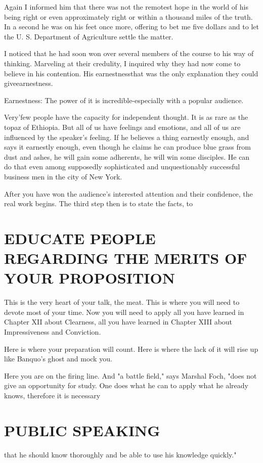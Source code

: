 \documentclass[10pt]{article}
\begin{document}
Again I informed him that there was not the remotest hope in the world of his being right or even approximately right or within a thousand miles of the truth. In a second he was on his feet once more, offering to bet me five dollars and to let the U. S. Department of Agriculture settle the matter.

I noticed that he had soon won over several members of the course to his way of thinking. Marveling at their credulity, I inquired why they had now come to believe in his contention. His earnestnessthat was the only explanation they could giveearnestness.

Earnestness: The power of it is incredible-especially with a popular audience.

Very'few people have the capacity for independent thought. It is as rare as the topaz of Ethiopia. But all of us have feelings and emotions, and all of us are influenced by the speaker's feeling. If he believes a thing earnestly enough, and says it earnestly enough, even though he claims he can produce blue grass from dust and ashes, he will gain some adherents, he will win some disciples. He can do that even among supposedly sophisticated and unquestionably successful business men in the city of New York.

After you have won the audience's interested attention and their confidence, the real work begins. The third step then is to state the facts, to

\section*{EDUCATE PEOPLE REGARDING THE MERITS OF YOUR PROPOSITION}
This is the very heart of your talk, the meat. This is where you will need to devote most of your time. Now you will need to apply all you have learned in Chapter XII about Clearness, all you have learned in Chapter XIII about Impressiveness and Conviction.

Here is where your preparation will count. Here is where the lack of it will rise up like Banquo's ghost and mock you.

Here you are on the firing line. And "a battle field," says Marshal Foch, "does not give an opportunity for study. One does what he can to apply what he already knows, therefore it is necessary

\section*{PUBLIC SPEAKING}
that he should know thoroughly and be able to use his knowledge quickly."
\end{document}
